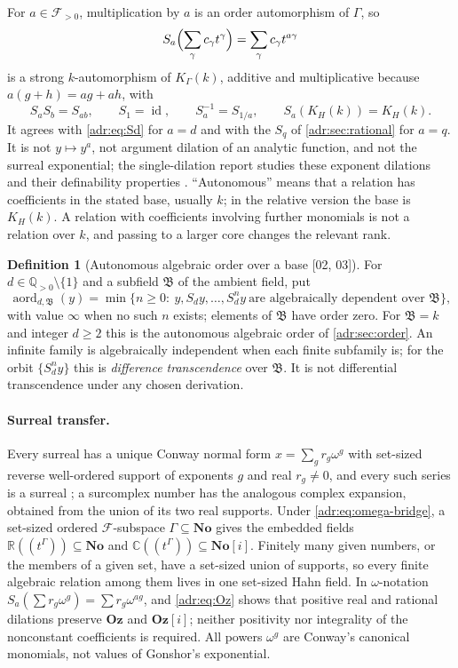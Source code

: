 \documentclass[11pt,letterpaper]{article}
\numberwithin{equation}{section}
\theoremstyle{definition}
\newtheorem{definition}[definition]{Definition}
\theoremstyle{remark}
\newcommand{\No}{\mathbf{No}}
\newcommand{\Oz}{\mathbf{Oz}}
\newcommand{\SC}{\mathbf{No}[i]}
\newcommand{\Goz}{\mathbf{Oz}[i]}
\newcommand{\C}{\mathbb C}
\newcommand{\R}{\mathbb R}
\newcommand{\Q}{\mathbb Q}
\newcommand{\K}{K_\Gamma(k)}
\newcommand{\id}{\operatorname{id}}
\newcommand{\src}[1]{\textup{[#1]}}%
\begin{document}
For $a\in\mathcal F_{>0}$, multiplication by $a$ is an order automorphism of
$\Gamma$, so
\begin{equation}\label{adr:sr:eq:dilation}
 S_a\Bigl(\sum_\gamma c_\gamma t^\gamma\Bigr)=\sum_\gamma c_\gamma t^{a\gamma}
\end{equation}
is a strong $k$-automorphism of $\K$, additive and multiplicative because
$a(g+h)=ag+ah$, with
\begin{equation}\label{adr:sr:eq:semigroup}
 S_aS_b=S_{ab},\qquad S_1=\id,\qquad S_a^{-1}=S_{1/a},\qquad S_a(K_H(k))=K_H(k).
\end{equation}
It agrees with \eqref{adr:eq:Sd} for $a=d$ and with the $S_q$ of
\cref{adr:sec:rational} for $a=q$. It is not $y\mapsto y^a$, not argument
dilation of an analytic function, and not the surreal exponential; the
single-dilation report studies these exponent dilations and their
definability properties \cite{RepoDilation}. ``Autonomous'' means that a
relation has coefficients in the stated base, usually $k$; in the relative
version the base is $K_H(k)$. A relation with coefficients involving further
monomials is not a relation over $k$, and passing to a larger core changes
the relevant rank.

\begin{definition}[Autonomous algebraic order over a base \src{02, 03}]
\label{adr:sr:def:aord}
For $d\in\Q_{>0}\setminus\{1\}$ and a subfield $\mathfrak B$ of the ambient
field, put
\[
 \operatorname{aord}_{d,\mathfrak B}(y)
  =\min\{n\ge0:\ y,S_dy,\ldots,S_d^ny\ \text{are algebraically dependent over }\mathfrak B\},
\]
with value $\infty$ when no such $n$ exists; elements of $\mathfrak B$ have
order zero. For $\mathfrak B=k$ and integer $d\ge2$ this is the autonomous
algebraic order of \cref{adr:sec:order}. An infinite family is algebraically
independent when each finite subfamily is; for the orbit
$\{S_d^ny\}$ this is \emph{difference transcendence} over $\mathfrak B$. It is
not differential transcendence under any chosen derivation.
\end{definition}

\paragraph{Surreal transfer.} Every surreal has a unique Conway normal form
$x=\sum_{g}r_g\omega^g$ with set-sized reverse well-ordered support of
exponents $g$ and real $r_g\ne0$, and every such series is a surreal
\cite[Chapter~5]{Gonshor}; a surcomplex number has the analogous complex
expansion, obtained from the union of its two real supports. Under
\eqref{adr:eq:omega-bridge}, a set-sized ordered $\mathcal F$-subspace
$\Gamma\subseteq\No$ gives the embedded fields $\R((t^\Gamma))\subseteq\No$ and
$\C((t^\Gamma))\subseteq\SC$. Finitely many given numbers, or the members of a
given set, have a set-sized union of supports, so every finite algebraic
relation among them lives in one set-sized Hahn field. In $\omega$-notation
$S_a(\sum r_g\omega^g)=\sum r_g\omega^{ag}$, and \eqref{adr:eq:Oz} shows that
positive real and rational dilations preserve $\Oz$ and $\Goz$; neither
positivity nor integrality of the nonconstant coefficients is required. All
powers $\omega^g$ are Conway's canonical monomials, not values of Gonshor's
exponential.
\end{document}
